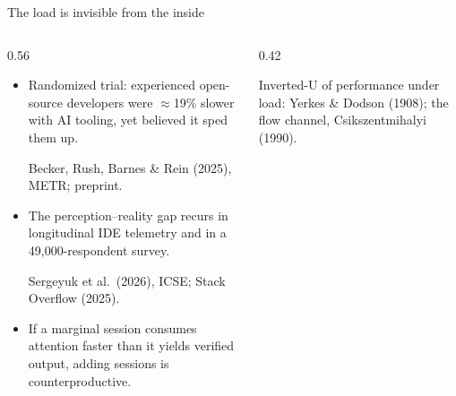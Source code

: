 \documentclass[aspectratio=169,10pt]{beamer}
\newcommand{\badc}[1]{\textcolor{Rust}{#1}}
\newcommand{\src}[1]{{\scriptsize\color{InkFaint}#1\par}}
\begin{document}
\begin{frame}{The load is invisible from the inside}
  \begin{columns}[T]
    \begin{column}{0.56\textwidth}
      \begin{itemize}
        \item Randomized trial: experienced open-source developers were
              \badc{$\approx$19\% slower} with AI tooling, yet
              \badc{believed it sped them up}.
              \src{Becker, Rush, Barnes \& Rein (2025), METR; preprint.}
        \item The perception--reality gap recurs in longitudinal IDE
              telemetry and in a 49{,}000-respondent survey.
              \src{Sergeyuk et al.\ (2026), ICSE; Stack Overflow (2025).}
        \item If a marginal session consumes attention faster than it yields
              verified output, adding sessions is
              \alert{counterproductive}.
      \end{itemize}
    \end{column}
    \begin{column}{0.42\textwidth}
      \centering
      \src{Inverted-U of performance under load: Yerkes \& Dodson (1908);
           the flow channel, Csikszentmihalyi (1990).}
    \end{column}
  \end{columns}
\end{frame}
\end{document}
